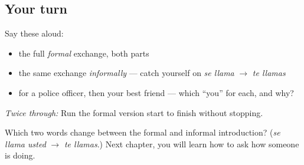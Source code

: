 \subsection*{Your turn}
Say these aloud:

\begin{itemize}
\raggedright
  \item the full \emph{formal} exchange, both parts
  \item the same exchange \emph{informally} — catch yourself on \emph{se llama} $\to$ \emph{te llamas}
  \item for a police officer, then your best friend — which \textquotedblleft{}you\textquotedblright{} for each, and why?
\end{itemize}

\emph{Twice through:} Run the formal version start to finish without stopping.

\begin{tcolorbox}[breakable,colback=teal!4,colframe=teal!35!black,title={Before you move on}]
Which two words change between the formal and informal introduction? (\emph{se llama usted} $\to$ \emph{te llamas}.) Next chapter, you will learn how to ask how someone is doing.
\end{tcolorbox}
